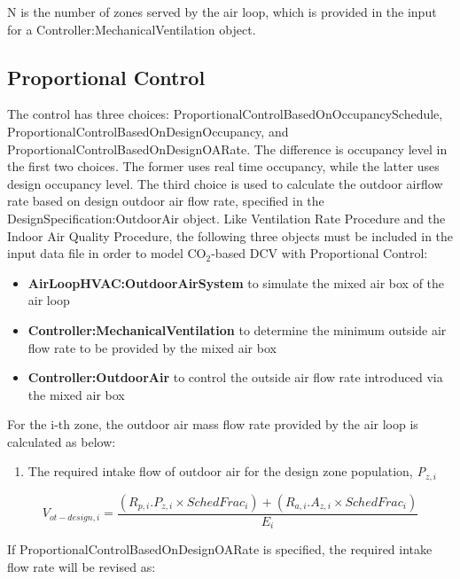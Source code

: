 N is the number of zones served by the air loop, which is provided in the input for a Controller:MechanicalVentilation object.

\subsection{Proportional Control}\label{proportional-control}

The control has three choices: ProportionalControlBasedOnOccupancySchedule,  ProportionalControlBasedOnDesignOccupancy, and ProportionalControlBasedOnDesignOARate. The difference is occupancy level in the first two choices. The former uses real time occupancy, while the latter uses design occupancy level. The third choice is used to calculate the outdoor airflow rate based on design outdoor air flow rate, specified in the DesignSpecification:OutdoorAir object. Like Ventilation Rate Procedure and the Indoor Air Quality Procedure, the following three objects must be included in the input data file in order to model CO\(_{2}\)-based DCV with Proportional Control:

\begin{itemize}
  \item \textbf{AirLoopHVAC:OutdoorAirSystem} to simulate the mixed air box of the air loop
  \item \textbf{Controller:MechanicalVentilation} to determine the minimum outside air flow rate to be provided by the mixed air box
  \item \textbf{Controller:OutdoorAir} to control the outside air flow rate introduced via the mixed air box
\end{itemize}

For the i-th zone, the outdoor air mass flow rate provided by the air loop is calculated as below:

\begin{enumerate}
\item The required intake flow of outdoor air for the design zone population, \emph{P\(_{z,i}\)}
\end{enumerate}


\begin{equation}
{V_{ot - design,i}} = \frac{{\left( {{R_{p,i}}.{P_{z,i}} \times {SchedFrac_i}} \right) + ({R_{a,i}}.{A_{z,i}} \times {SchedFrac_i})}}{{{E_i}}}
\end{equation}

If ProportionalControlBasedOnDesignOARate is specified, the required intake flow rate will be revised as:

